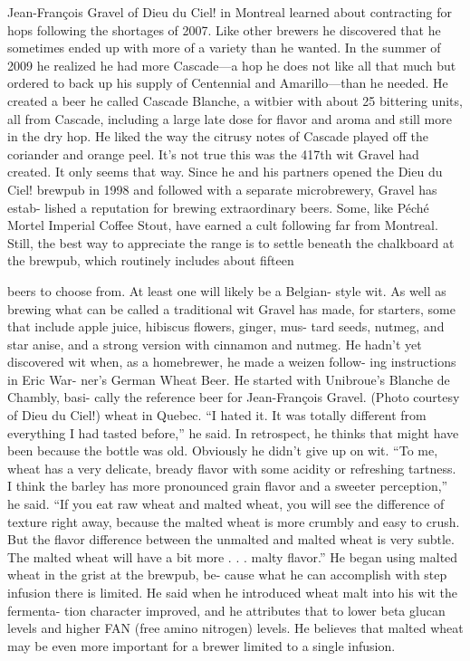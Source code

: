 \documentclass[a4paper,parskip=half]{scrartcl}
\begin{document}
Jean-François Gravel of Dieu du Ciel! in Montreal learned about contracting for
hops following the shortages of 2007. Like other brewers he discovered
that he sometimes ended up with more of a variety than he wanted. In
the summer of 2009 he realized he had more Cascade—a hop he does
not like all that much but ordered to back up his supply of Centennial
and Amarillo—than he needed.
He created a beer he called Cascade Blanche, a witbier with about
25 bittering units, all from Cascade, including a large late dose for flavor
and aroma and still more in the dry hop. He liked the way the citrusy
notes of Cascade played off the coriander and orange peel.
It’s not true this was the 417th wit Gravel had created. It only seems
that way. Since he and his partners opened the Dieu du Ciel! brewpub
in 1998 and followed with a separate microbrewery, Gravel has estab-
lished a reputation for brewing extraordinary beers. Some, like Péché
Mortel Imperial Coffee Stout, have earned a cult following far from
Montreal. Still, the best way to appreciate the range is to settle beneath
the chalkboard at the brewpub, which routinely includes about fifteen

\parencite[72]{Hieronymus2010}
beers to choose from. At least
one will likely be a Belgian-
style wit.
As well as brewing what
can be called a traditional wit
Gravel has made, for starters,
some that include apple juice,
hibiscus flowers, ginger, mus-
tard seeds, nutmeg, and star
anise, and a strong version
with cinnamon and nutmeg.
He hadn’t yet discovered
wit when, as a homebrewer,
he made a weizen follow-
ing instructions in Eric War-
ner’s German Wheat Beer.
He started with Unibroue’s
Blanche de Chambly, basi-
cally the reference beer for
Jean-François Gravel. (Photo courtesy of Dieu du Ciel!)
wheat in Quebec. “I hated it.
It was totally different from everything I had tasted before,” he said. In
retrospect, he thinks that might have been because the bottle was old.
Obviously he didn’t give up on wit.
“To me, wheat has a very delicate, bready flavor with some acidity
or refreshing tartness. I think the barley has more pronounced grain
flavor and a sweeter perception,” he said. “If you eat raw wheat and
malted wheat, you will see the difference of texture right away, because
the malted wheat is more crumbly and easy to crush. But the flavor
difference between the unmalted and malted wheat is very subtle. The
malted wheat will have a bit more . . . malty flavor.”
He began using malted wheat in the grist at the brewpub, be-
cause what he can accomplish with step infusion there is limited.
He said when he introduced wheat malt into his wit the fermenta-
tion character improved, and he attributes that to lower beta glucan
levels and higher FAN (free amino nitrogen) levels. He believes that
malted wheat may be even more important for a brewer limited to
a single infusion.
\end{document}

